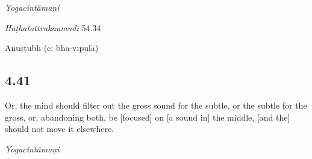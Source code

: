\begin{ekdosis}

\begin{testimonia}[hp04_040]
\emph{Yogacintāmaṇi}
\begin{versinnote}
\end{versinnote}

\emph{Haṭhatattvakaumudī} 54.34
\begin{versinnote}
\end{versinnote}
\end{testimonia}


\begin{metre}[hp04_040]
Anuṣṭubh (c: bha-vipulā)
\end{metre}

\subsection*{4.41}
\begin{translation}[hp04_041]
Or, the mind should filter out the gross sound for the subtle, or the subtle for the gross, or, abandoning both, be [focused] on [a sound in] the middle, [and the] should not move it elsewhere.%
\end{translation}


\begin{testimonia}[hp04_041]
\emph{Yogacintāmaṇi}
\begin{versinnote}
\end{versinnote}


\end{testimonia}
\end{ekdosis}
